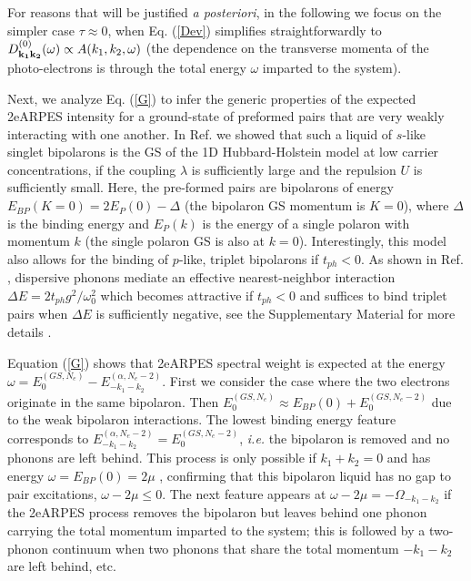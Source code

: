 \documentclass[prl,twocolumn,showpacs,amsmath,amssymb,superscriptaddress,floatfix]{revtex4}
\begin{document}
For reasons that will be justified {\em a posteriori},
in the following we focus on the simpler case $\tau \approx 0$, when Eq. (\ref{Dev}) simplifies straightforwardly to $D^{(0)}_{{\bf k_1 k_2}}(\omega) \propto A(k_1,k_2,\omega)$ (the dependence on the transverse momenta of the photo-electrons is through the total energy $\omega$ imparted to the system).

Next, we analyze Eq. (\ref{G}) to infer the generic properties of the expected 2eARPES intensity  for a ground-state of preformed pairs that are  very weakly interacting with one another.  In Ref.  we showed that such a liquid of $s$-like singlet bipolarons is the GS of the 1D Hubbard-Holstein model at low carrier concentrations, if the coupling $\lambda$ is sufficiently large and the repulsion $U$ is sufficiently small. Here, the pre-formed pairs are bipolarons of energy $E_{BP}(K=0)= 2E_P(0)-\Delta$ (the bipolaron GS momentum is $K=0$), where $\Delta$ is the binding energy and $E_P(k)$ is the energy of a single polaron with momentum $k$ (the single polaron GS is also at $k=0$). Interestingly, this model also allows for the binding of $p$-like, triplet bipolarons if  $t_{ph}<0$. As shown in Ref. \cite{Klemen2024}, dispersive phonons mediate an effective nearest-neighbor interaction $\Delta E = 2 t_{ph} g^2/\omega_0^2$ which becomes attractive if $t_{ph}<0$ and suffices to bind triplet pairs when $\Delta E$ is sufficiently negative, see the Supplementary Material for more details \cite{SM}.


Equation (\ref{G}) shows that 2eARPES spectral weight is expected at the energy $\omega = E_0^{(GS,N_e)} - E_{-k_1-k_2}^{(\alpha,N_e-2)}$. First we consider the case where the two electrons originate in the same bipolaron. Then $E_0^{(GS,N_e)}\approx E_{BP}(0) + E_0^{(GS,N_e-2)}$ due to the weak bipolaron interactions. The lowest binding energy feature corresponds to $E_{-k_1-k_2}^{(\alpha,N_e-2)} = E_0^{(GS,N_e-2)}$, {\em i.e.} the bipolaron is removed and no phonons are left behind. This process is only possible if $k_1+k_2=0$ and has energy $\omega = E_{BP}(0)=2\mu$ \cite{Klemen2025}, confirming that this bipolaron liquid has no gap to pair excitations, $\omega - 2\mu \le 0$. The next feature appears at $\omega -2\mu = - \Omega_{-k_1-k_2}$ if the 2eARPES process removes the bipolaron but leaves behind one phonon carrying the total momentum imparted to the system; this is followed by a two-phonon continuum when two phonons that share the total momentum $-k_1-k_2$ are left behind, etc.
\end{document}
